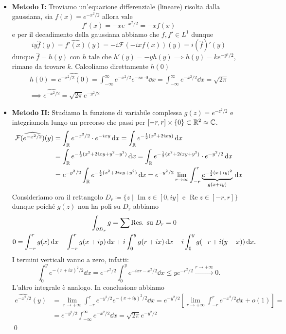 \begin{itemize}
	\item \textbf{Metodo I:} Troviamo un'equazione differenziale (lineare) risolta dalla gaussiana, sia $f(x) = e^{-x^2 / 2}$ allora vale
		$$
		f'(x) = -x e^{-x^2/2} = -x f(x)
		$$
		e per il decadimento della gaussiana abbiamo che $f, f' \in L^1$ dunque
		$$
		i y \hat f(y) = \hat{f'(x)}(y) = -i \mathcal F(-i x f(x))(y) = i (\hat{f})' (y)
		$$
		dunque $\hat f = h(y)$ con $h$ tale che $h'(y) = -y h(y) \implies h(y) = k e^{-y^2 / 2}$, rimane da trovare $k$. Calcoliamo direttamente $h(0)$
		$$
		\begin{gathered}
			h(0) 
			= \hat{e^{-x^2/2}(0)} 
			= \int_{-\infty}^\infty e^{-x^2 / 2} e^{-ix \cdot 0} \dd x
			= \int_{-\infty}^\infty e^{-x^2 / 2} \dd x = \sqrt{2\pi} \\
			\implies \hat{e^{-x^2/2}} = \sqrt{2\pi} e^{-y^2 / 2}
		\end{gathered}
		$$

	\item \textbf{Metodo II:} Studiamo la funzione di variabile complessa $g(z) = e^{-z^2/2}$ e integriamola lungo un percorso che passi per $[-r, r] \times \{ 0 \} \subset \mathbb R^2 \approx \mathbb C$.
		$$
		\begin{aligned}
			\mathcal F(\widehat{e^{-x^2/2}})(y) 
			&= \int_\mathbb R e^{-x^2 / 2} \cdot e^{-ixy} \,\mathrm{d} x
			= \int_\mathbb R e^{-\frac{1}{2}(x^2 + 2ixy)} \,\mathrm{d} x \\
			&= \int_\mathbb R e^{-\frac{1}{2}(x^2 + 2ixy + y^2 - y^2)} \,\mathrm{d} x 
			= \int_\mathbb R e^{-\frac{1}{2}(x^2 + 2ixy + y^2)} \cdot e^{-y^2 / 2} \,\mathrm{d} x \\
			&= e^{-y^2 / 2} \int_\mathbb R e^{-\frac{1}{2}(x^2 + 2ixy + y^2)} \,\mathrm{d} x 
			= e^{-y^2 / 2} \lim_{r \to \infty} \int_{-r}^r \underbrace{e^{-\frac{1}{2}(x + iy)^2}}_{g(x + iy)} \,\mathrm{d} x
		\end{aligned}
		$$
		Consideriamo ora il rettangolo $D_r \coloneqq \{ z \mid \operatorname{Im} z \in [0, iy] \text{ e } \operatorname{Re} z \in [-r, r] \}$ dunque poiché $g(z)$ non ha poli su $D_r$ abbiamo
		$$
		\begin{gathered}
			\int_{\partial D_r} g = \sum \text{Res. su $D_r$} = 0 \\
			0 = \int_{-r}^r g(x) \,\mathrm{d} x - \int_{-r}^r g(x + iy) \,\mathrm{d} x 
			+ i \int_{0}^{y} g(r + ix) \,\mathrm{d} x - i\int_{0}^{y} g(-r + i(y-x)) \,\mathrm{d} x.
		\end{gathered}
		$$
		I termini verticali vanno a zero, infatti:
		$$
			\int_0^y e^{-(r+ix)^2 / 2} \dd x
			= e^{-r^2 / 2} \int_0^y e^{-ixr - x^2/2} \dd x \leq y e^{-r^2 / 2} \xrightarrow{r \to +\infty} 0.
		$$
		L'altro integrale è analogo. In conclusione abbiamo
		$$
		\begin{aligned}
			\hat{e^{-x^2 / 2}} (y) 
			&= \lim_{r \to +\infty} \int_{-r}^r e^{-y^2 / 2} e^{-(x + iy)^2 / 2} \dd x 
			= e^{-y^2 / 2} \left[ \lim_{r \to +\infty} \int_{-r}^r e^{-x^2 / 2} \dd x + o(1) \right] = \\
			&= e^{-y^2 / 2} \int_{-\infty}^\infty e^{-x^2 / 2} \dd x = \sqrt{2\pi} e^{-y^2 / 2} 
		\end{aligned}
		$$
		\qed

\end{itemize}



